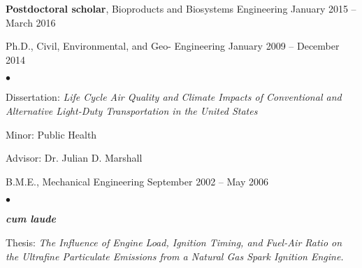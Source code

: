 \documentclass[margin,line,10pt]{res}
\newenvironment{list1}{
  \begin{list}{\ding{113}}{%
      \setlength{\itemsep}{0in}
      \setlength{\parsep}{0in} \setlength{\parskip}{0in}
      \setlength{\topsep}{0in} \setlength{\partopsep}{0in}
      \setlength{\leftmargin}{0.17in}}}{\end{list}}
\newenvironment{list2}{
  \begin{list}{$\bullet$}{%
      \setlength{\itemsep}{0in}
      \setlength{\parsep}{0in} \setlength{\parskip}{0in}
      \setlength{\topsep}{0in} \setlength{\partopsep}{0in}
      \setlength{\leftmargin}{0.2in}}}{\end{list}}
\begin{document}
\begin{resume}
\vspace*{-.1in}

\begin{list1}
\item[] \textbf{Postdoctoral scholar}, Bioproducts and Biosystems Engineering \hfill January 2015 -- March 2016\\

\vspace*{-.1in}

\item[] Ph.D., Civil, Environmental, and Geo- Engineering \hfill January 2009 -- December 2014\\
\begin{list2}
\vspace*{-.12in}
\item Dissertation: \textit{Life Cycle Air Quality and Climate Impacts of Conventional and Alternative Light-Duty Transportation in the United States}
\item Minor: Public Health
\item Advisor:  Dr. Julian D. Marshall
\end{list2}

\vspace*{.05in}

\item[] B.M.E., Mechanical Engineering \hfill September 2002 -- May 2006\\
\vspace*{-.12in}
\begin{list2}
\item {\bf {\em cum laude}}
\item Thesis: \textit{The Influence of Engine Load, Ignition Timing, and Fuel-Air Ratio on the Ultrafine Particulate Emissions from a Natural Gas Spark Ignition Engine.}
\end{list2}
\end{list1}






\end{resume}
\end{document}
